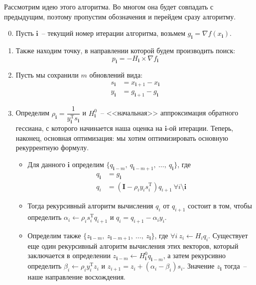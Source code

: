 \documentclass[12pt, a4paper, oneside, final]{article}
\begin{document}
	Рассмотрим идею этого алгоритма.
	Во многом она будет совпадать с предыдущим, поэтому пропустим обозначения и перейдем сразу алгоритму.
	\begin{enumerate}[1)]
		\setcounter{enumi}{-1}
		\item Пусть $\mathbf{i}$~-- текущий номер итерации алгоритма, возьмем $g_{\mathbf{i}} = \nabla{f(x_{\mathbf{i}})}$.
		\item Также находим точку, в направлении которой будем производить поиск:
		\[
			p_{\mathbf{i}} = -H_{\mathbf{i}} \times \nabla{f_{\mathbf{i}}}
		\]
		\item Пусть мы сохранили $m$ обновлений вида:
		\begin{align*}
			s_{\mathbf{i}} &= x_{\mathbf{i} + 1} - x_{\mathbf{i}} \\
			y_{\mathbf{i}} &= g_{\mathbf{i} + 1} - g_{\mathbf{i}}
		\end{align*}
		\item Определим $\rho_{\mathbf{i}} = \dfrac{1}{y_{\mathbf{i}}^{\mathrm{T}}s_{\mathbf{i}}}$ и $H_{\mathbf{i}}^{0}$~-- <<начальная>> аппроксимация обратного гессиана, с которого начинается наша оценка на $\mathbf{i}$-ой итерации.
		Теперь, наконец, основная оптимизация: мы хотим оптимизировать основную рекуррентную формулу.
		\begin{itemize}
			\item Для данного $\mathbf{i}$ определим $\{q_{\mathbf{i} - m}, ~ q_{\mathbf{i} - m + 1}, ~ \ldots, ~ q_{\mathbf{i}}\}$, где
			\begin{align*}
				q_{\mathbf{i}} &= g_{\mathbf{i}} \\
				q_{i} &= \left(\mathbf{I} - \rho_{i}y_{i}s_{i}^{\mathrm{T}}\right)q_{i + 1} ~ \forall i \setminus \mathbf{i}
			\end{align*}
			\item Тогда рекурсивный алгоритм вычисления $q_{i}$ от $q_{i + 1}$ состоит в том, чтобы определить $\alpha_{i} \gets \rho_{i}s_{i}^{\mathrm{T}}q_{i + 1}$ и $q_{i} = q_{i + 1} - \alpha_{i}y_{i}$.
			\item Определим также $\{z_{\mathbf{i} - m}, ~ z_{\mathbf{i} - m + 1}, ~ \ldots, ~ z_{\mathbf{i}}\}$, где $\forall i ~ z_{i} \gets H_{i}q_{i}$.
			\subitem Существует еще один рекурсивный алгоритм вычисления этих векторов, который заключается в определении $z_{\mathbf{i} - m} \gets H_{\mathbf{i}}^{0}q_{\mathbf{i} - m}$, а затем рекурсивно определить $\beta_{i} \gets \rho_{i}y_{i}^{\mathrm{T}}z_{i}$ и $z_{i + 1} = z_{i} + (\alpha_{i} - \beta_{i})s_{i}$. Значение $z_{\mathbf{i}}$ тогда~-- наше направление восхождения.

\end{itemize}
\end{enumerate}
\end{document}
